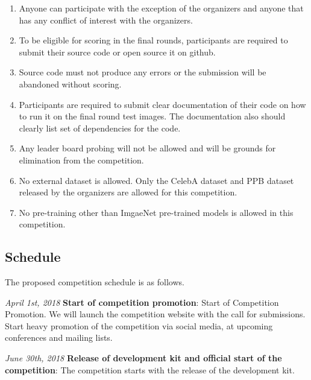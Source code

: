 \documentclass[11pt, oneside]{article}
\begin{document}
\begin{enumerate}
    \item Anyone can participate with the exception of the organizers and anyone that has any conflict of interest with the organizers.
    \item To be eligible for scoring in the final rounds, participants are required to submit their source code or open source it on github.
    \item Source code must not produce any errors or the submission will be abandoned without scoring.
    \item Participants are required to submit clear documentation of their code on how to run it on the final round test images. The documentation also should clearly list set of dependencies for the code.
    \item Any leader board probing will not be allowed and will be grounds for elimination from the competition.
    \item No external dataset is allowed. Only the CelebA dataset and PPB dataset released by the organizers are allowed for this competition.
    \item No pre-training other than ImgaeNet pre-trained models is allowed in this competition.
\end{enumerate}

\subsection{Schedule}

The proposed competition schedule is as follows.

{\it April 1st, 2018} {\bf Start of competition promotion}: Start of Competition Promotion. We will launch the competition website with the call for submissions. Start heavy promotion of the competition via social media, at upcoming conferences and mailing lists.

{\it June 30th, 2018} {\bf Release of development kit and official start of the competition}: The competition starts with the release of the development kit. 
\end{document}
